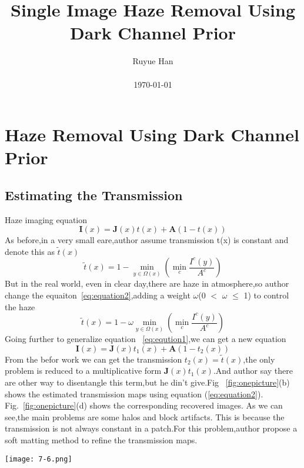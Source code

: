 \documentclass[10pt,twocolumn,letterpaper]{article}
\begin{document}
\title{Single Image Haze Removal Using Dark Channel Prior}

\author{Ruyue Han\\\\ \today}

\maketitle

\section{Haze Removal Using Dark Channel Prior}
\subsection{Estimating the Transmission}
Haze imaging equation
\begin{equation}
\textbf{I}(x) = \textbf{J}(x)t(x)+\textbf{A}(1-t(x)) \label{eq:eqution1}
\end{equation}
As before,in a very small eare,author assume transmission t(x) is constant and denote this as $\widetilde{t}(x)$ 
\begin{equation}
\widetilde{t}(x) = 1- \min_{y\in{\Omega{(x)}}}\left(\min_{c}\frac{I^{c}(y)}{A^{c}} \right)
\label{eq:equation2}
\end{equation}
But in the real world, even in clear day,there are haze in atmosphere,so author change the equaiton~\ref{eq:equation2},adding a weight $\omega$(0 $<$ $\omega$ $\leq$ 1) to control the haze
\begin{equation}
\widetilde{t}(x) = 1- \omega \min_{y\in{\Omega{(x)}}}\left(\min_{c}\frac{I^{c}(y)}{A^{c}} \right)
\end{equation}
Going further to generalize equation ~\ref{eq:eqution1},we can get a new equation
\begin{equation}
\textbf{I}(x) = \textbf{J}(x)t_{1}(x)+\textbf{A}(1-t_{2}(x))
\end{equation}
From the befor work we can get the transmission $t_{2}(x)=\widetilde{t}(x)$,the only problem is reduced to a multiplicative form $\textbf{J}(x)t_{1}(x)$.And author say there are other way to disentangle this term,but he din't give.Fig
~\ref{fig:onepicture}(b) shows the estimated transmission maps using equation (\ref{eq:equation2}). Fig.~\ref{fig:onepicture}(d) shows the corresponding recovered images. As we can see,the main problems are some halos and block artifacts. This is because the transmission is not always constant in a patch.For this problem,author propose a soft matting method to refine the transmission maps.
\begin{figure*}[htb]
\centering
\texttt{[image: 7-6.png]}
\caption{Haze removal. (a) Input hazy images. (b) Estimated transmission maps before soft matting. (c) Refined transmission maps after soft matting.
(d), (e) Recovered images using (b) and (c), respectively.}
\label{fig:onepicture}
\end{figure*}
\end{document}
